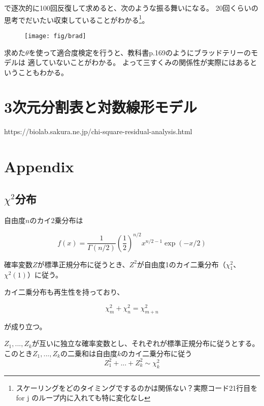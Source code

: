 \documentclass[10pt, a4paper]{ltjsarticle}
\begin{document}
で逐次的に100回反復して求めると、次のような振る舞いになる。
20回くらいの思考でだいたい収束していることがわかる\footnote{スケーリングをどのタイミングでするのかは関係ない？実際コード21行目を for j のループ内に入れても特に変化なし}。

\begin{figure}[h]
 \centering
 \texttt{[image: fig/brad]}
 \caption{}
\end{figure}

求めた$\theta$を使って適合度検定を行うと、教科書p.169のようにブラッドテリーのモデルは
適していないことがわかる。
よって三すくみの関係性が実際にはあるということもわかる。


\newpage

\section{3次元分割表と対数線形モデル}

https://biolab.sakura.ne.jp/chi-square-residual-analysis.html


\newpage

\section{Appendix}

\subsection{$\chi^2$分布}

自由度$n$のカイ2乗分布は

\begin{equation}
  f(x) = \frac{1}{\Gamma(n/2)}\left(\frac{1}{2}\right)^{n/2}x^{n/2-1}\exp({-x/2})
\end{equation}

確率変数$Z$が標準正規分布に従うとき、$Z^2$が自由度1のカイ二乗分布（$\chi^2_1$、$\chi^2(1)$）に従う。

カイ二乗分布も再生性を持っており、

\begin{equation}
  \chi^2_m + \chi^2_n = \chi^2_{m+n}
\end{equation}

が成り立つ。

$Z_1,...,Z_k$が互いに独立な確率変数とし、それぞれが標準正規分布に従うとする。このとき$Z_1,...,Z_k$の二乗和は自由度$k$のカイ二乗分布に従う
\begin{equation}
  Z_1^2+...+Z_k^2 \sim \chi^2_k
\end{equation}
\end{document}
